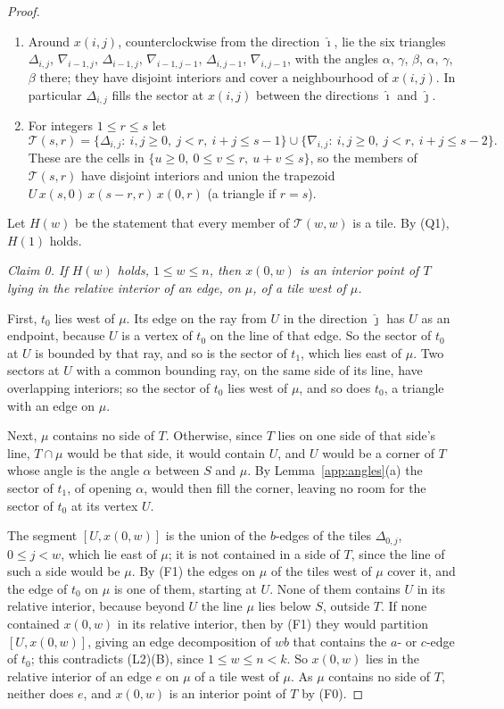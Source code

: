 \documentclass[11pt]{amsart}
\theoremstyle{remark}
\begin{document}
\begin{proof}
\begin{enumerate}
\item[(Q2)] Around $x(i,j)$, counterclockwise from the direction $\hat\imath$, lie the six triangles $\Delta_{i,j}$, $\nabla_{i-1,j}$, $\Delta_{i-1,j}$, $\nabla_{i-1,j-1}$, $\Delta_{i,j-1}$, $\nabla_{i,j-1}$, with the angles $\alpha$, $\gamma$, $\beta$, $\alpha$, $\gamma$, $\beta$ there; they have disjoint interiors and cover a neighbourhood of $x(i,j)$. In particular $\Delta_{i,j}$ fills the sector at $x(i,j)$ between the directions $\hat\imath$ and $\hat\jmath$.
\item[(Q3)] For integers $1\le r\le s$ let
\[
\mathcal{T}(s,r)=\{\Delta_{i,j}:\ i,j\ge0,\ j<r,\ i+j\le s-1\}\cup\{\nabla_{i,j}:\ i,j\ge0,\ j<r,\ i+j\le s-2\}.
\]
These are the cells in $\{u\ge0,\ 0\le v\le r,\ u+v\le s\}$, so the members of $\mathcal{T}(s,r)$ have disjoint interiors and union the trapezoid $U\,x(s,0)\,x(s-r,r)\,x(0,r)$ (a triangle if $r=s$).
\end{enumerate}
Let $H(w)$ be the statement that every member of $\mathcal{T}(w,w)$ is a tile. By (Q1), $H(1)$ holds.

\emph{Claim 0. If $H(w)$ holds, $1\le w\le n$, then $x(0,w)$ is an interior point of $T$ lying in the relative interior of an edge, on $\mu$, of a tile west of $\mu$.}

First, $t_0$ lies west of $\mu$. Its edge on the ray from $U$ in the direction $\hat\jmath$ has $U$ as an endpoint, because $U$ is a vertex of $t_0$ on the line of that edge. So the sector of $t_0$ at $U$ is bounded by that ray, and so is the sector of $t_1$, which lies east of $\mu$. Two sectors at $U$ with a common bounding ray, on the same side of its line, have overlapping interiors; so the sector of $t_0$ lies west of $\mu$, and so does $t_0$, a triangle with an edge on $\mu$.

Next, $\mu$ contains no side of $T$. Otherwise, since $T$ lies on one side of that side's line, $T\cap\mu$ would be that side, it would contain $U$, and $U$ would be a corner of $T$ whose angle is the angle $\alpha$ between $S$ and $\mu$. By Lemma~\ref{app:angles}(a) the sector of $t_1$, of opening $\alpha$, would then fill the corner, leaving no room for the sector of $t_0$ at its vertex $U$.

The segment $[U,x(0,w)]$ is the union of the $b$-edges of the tiles $\Delta_{0,j}$, $0\le j<w$, which lie east of $\mu$; it is not contained in a side of $T$, since the line of such a side would be $\mu$. By (F1) the edges on $\mu$ of the tiles west of $\mu$ cover it, and the edge of $t_0$ on $\mu$ is one of them, starting at $U$. None of them contains $U$ in its relative interior, because beyond $U$ the line $\mu$ lies below $S$, outside $T$. If none contained $x(0,w)$ in its relative interior, then by (F1) they would partition $[U,x(0,w)]$, giving an edge decomposition of $wb$ that contains the $a$- or $c$-edge of $t_0$; this contradicts (L2)(B), since $1\le w\le n<k$. So $x(0,w)$ lies in the relative interior of an edge $e$ on $\mu$ of a tile west of $\mu$. As $\mu$ contains no side of $T$, neither does $e$, and $x(0,w)$ is an interior point of $T$ by (F0).


\end{proof}
\end{document}
